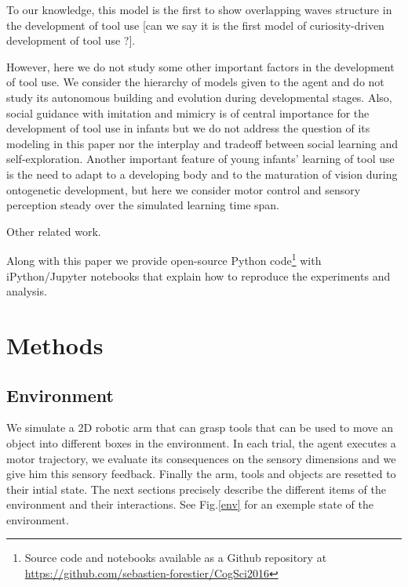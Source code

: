 \documentclass[10pt,letterpaper]{article}
\begin{document}
	To our knowledge, this model is the first to show overlapping waves structure in the development of tool use [can we say it is the first model of curiosity-driven development of tool use ?].
	
	However, here we do not study some other important factors in the development of tool use.
	We consider the hierarchy of models given to the agent and do not study its autonomous building and evolution during developmental stages.
	Also, social guidance with imitation and mimicry is of central importance for the development of tool use in infants but we do not address the question
	of its modeling in this paper nor the interplay and tradeoff between social learning and self-exploration.
	Another important feature of young infants' learning of tool use is the need to adapt to a developing body and to the maturation of vision during ontogenetic development, 
	but here we consider motor control and sensory perception steady over the simulated learning time span.
	
	
	Other related work.
	\cite{ugur2015}
	\cite{schmerlinggoal}
	\cite{forestier2015}
	\cite{unifying}

	Along with this paper we provide open-source Python code\footnote{Source code and notebooks available as a Github repository at \url{https://github.com/sebastien-forestier/CogSci2016}} 
	with iPython/Jupyter notebooks that explain how to reproduce the experiments and analysis. 
	
	
%

\section{Methods}

	\subsection{Environment}
	
		We simulate a 2D robotic arm that can grasp tools that can be used to move an object into different boxes in the environment. 		
		In each trial, the agent executes a motor trajectory, we evaluate its consequences on the sensory dimensions and we give him
		this sensory feedback. Finally the arm, tools and objects are resetted to their intial state.
		The next sections precisely describe the different items of the environment and their interactions.	
		See Fig.\ref{env} for an exemple state of the environment. 
		
\end{document}
